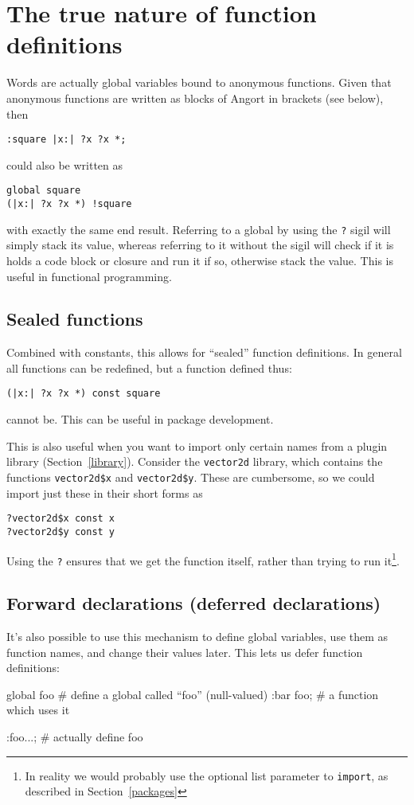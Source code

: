 



\section{The true nature of function definitions}
\label{globdetails}
Words are actually global variables bound to anonymous functions.
Given that anonymous functions are written as blocks of Angort
in brackets (see below), then
\begin{lstlisting}
:square |x:| ?x ?x *;
\end{lstlisting}
could also be written as
\begin{lstlisting}
global square
(|x:| ?x ?x *) !square
\end{lstlisting}
with exactly the same end result. Referring to a global by using the \texttt{?} sigil
will simply stack its value, whereas referring to it without the sigil
will check if it is holds a code block or closure and run it if so, otherwise
stack the value. This is useful in functional programming.

\subsection{Sealed functions}
Combined with constants, this allows for ``sealed'' function definitions. 
In general all functions can be redefined, but a function defined thus:
\begin{lstlisting}
(|x:| ?x ?x *) const square
\end{lstlisting}
cannot be. This can be useful in package development.

This is also useful when you want to import only certain names from
a plugin library (Section~\ref{library}). Consider the \texttt{vector2d} library, which contains
the functions \texttt{vector2d\$x} and \texttt{vector2d\$y}. These
are cumbersome, so we could import just these in their short forms
as
\begin{lstlisting}
?vector2d$x const x
?vector2d$y const y
\end{lstlisting}
Using the \texttt{?} ensures that we get the function itself, rather
than trying to run it\footnote{In reality we would probably use
the optional list parameter to \texttt{import}, as described in
Section~\ref{packages}}.

\subsection{Forward declarations (deferred declarations)}
It's also possible to use this mechanism to define global variables,
use them as function names, and change their values later. This lets
us defer function definitions:
\begin{v}
global foo      # define a global called ``foo'' (null-valued)
:bar foo;       # a function which uses it

:foo...;        # actually define foo
\end{v}

